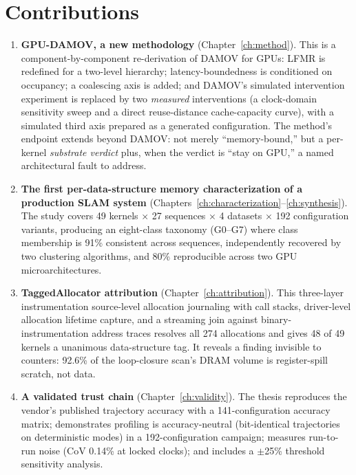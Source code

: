 \section{Contributions}
\begin{enumerate}

\item \textbf{GPU-DAMOV, a new methodology} (Chapter~\ref{ch:method}). This is a component-by-component re-derivation of DAMOV for GPUs: LFMR is redefined for a two-level hierarchy; latency-boundedness is conditioned on occupancy; a coalescing axis is added; and DAMOV's simulated intervention experiment is replaced by two \emph{measured} interventions (a clock-domain sensitivity sweep and a direct reuse-distance cache-capacity curve), with a simulated third axis prepared as a generated configuration. The method’s endpoint extends beyond DAMOV: not merely ``memory-bound,'' but a per-kernel \emph{substrate verdict} plus, when the verdict is ``stay on GPU,'' a named architectural fault to address.

\item \textbf{The first per-data-structure memory characterization of a production SLAM system} (Chapters~\ref{ch:characterization}--\ref{ch:synthesis}). The study covers 49 kernels $\times$ 27 sequences $\times$ 4 datasets $\times$ 192 configuration variants, producing an eight-class taxonomy (G0--G7) where class membership is 91\% consistent across sequences, independently recovered by two clustering algorithms, and 80\% reproducible across two GPU microarchitectures.    

\item \textbf{TaggedAllocator attribution} (Chapter~\ref{ch:attribution}). This three-layer instrumentation source-level allocation journaling with call stacks, driver-level allocation lifetime capture, and a streaming join against binary-instrumentation address traces resolves all 274 allocations and gives 48 of 49 kernels a unanimous data-structure tag. It reveals a finding invisible to counters: 92.6\% of the loop-closure scan's DRAM volume is register-spill scratch, not data.   

\item \textbf{A validated trust chain} (Chapter~\ref{ch:validity}). The thesis reproduces the vendor's published trajectory accuracy with a 141-configuration accuracy matrix; demonstrates profiling is accuracy-neutral (bit-identical trajectories on deterministic modes) in a 192-configuration campaign; measures run-to-run noise (CoV 0.14\% at locked clocks); and includes a $\pm$25\% threshold sensitivity analysis.


\end{enumerate}
